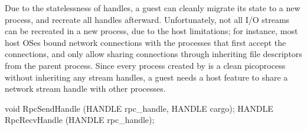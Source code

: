 












Due to the statelessness of handles,
a guest can cleanly migrate its state to a new process, and recreate all handles afterward.
Unfortunately, not all I/O streams can be recreated
in a new process, due to the host limitations;
for instance, most host OSes bound network connections with the processes that first accept the connections,
and only allow sharing connections through inheriting
file descriptors from the parent process.
Since every process created by  is a clean picoprocess without inheriting any stream handles,
a guest needs a host feature
to share a network stream handle with other processes.


\begin{paldef}
void   RpcSendHandle (HANDLE rpc_handle, HANDLE cargo);
HANDLE RpcRecvHandle (HANDLE rpc_handle);
\end{paldef}



